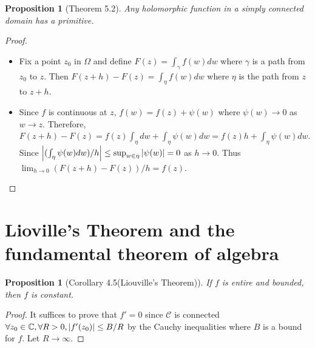 \documentclass[12pt, psamsfonts]{amsart}
\newtheorem{prop}[thm]{Proposition}
\theoremstyle{definition}
\theoremstyle{remark}
\numberwithin{equation}{section}
\begin{document}
\begin{prop}[Theorem 5.2]
  Any holomorphic function in a simply connected domain has a primitive.
\end{prop}

\begin{proof}
  $ $
  \begin{itemize}
    \item
      Fix a point $z_0$ in $\Omega$ and define $F(z) = \int_{\gamma}f(w)dw$ where $\gamma$ is a path from $z_0$ to $z$.
      Then $F(z + h) - F(z) = \int_{\eta} f(w)dw$ where $\eta$ is the path from $z$ to $z + h$.
    \item
      Since $f$ is continuous at $z$, $f(w) = f(z) + \psi(w)$ where $\psi(w) \rightarrow 0$ as $w \rightarrow z$.
      Therefore, $F(z + h) - F(z) = f(z)\int_{\eta}dw + \int_{\eta} \psi(w)dw = f(z)h + \int_{\eta} \psi(w)dw$.
      Since $\abs{(\int_{\eta} \psi(w) dw) / h} \leq \sup_{w \in \eta} \abs{\psi(w)} = 0$ as $h \rightarrow 0$.
      Thus $\lim_{h \rightarrow 0} (F(z + h) - F(z)) / h = f(z)$.
  \end{itemize}
\end{proof}

\section{Lioville’s Theorem and the fundamental theorem of algebra}

\begin{prop}[Corollary 4.5(Liouville's Theorem)]
  If $f$ is entire and bounded, then $f$ is constant.
\end{prop}

\begin{proof}
  It suffices to prove that $f' = 0$ since $\mathcal{C}$ is connected
  $\forall z_0 \in \mathbb{C}, \forall R > 0, \abs{f'(z_0)} \leq B  / R$ by the Cauchy inequalities where $B$ is a bound for $f$.
  Let $R \rightarrow \infty$.
\end{proof}
\end{document}
